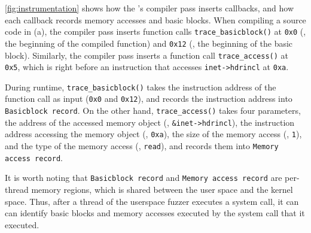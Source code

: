 \autoref{fig:instrumentation} shows how the \sys's compiler pass
inserts callbacks, and how each callback records memory accesses and
basic blocks.
%
When compiling a source code in (a), the compiler pass inserts
function calls \texttt{trace_basicblock()} at \texttt{0x0} (\ie, the
beginning of the compiled function) and \texttt{0x12} (\ie, the
beginning of the basic block).
%
Similarly, the compiler pass inserts a function call
\texttt{trace_access()} at \texttt{0x5}, which is right before an
instruction that accesses \texttt{inet->hdrincl} at \texttt{0xa}.


During runtime, \texttt{trace_basicblock()} takes the instruction
address of the function call as input (\ie \texttt{0x0} and
\texttt{0x12}), and records the instruction address into
\texttt{Basicblock record}.
%
On the other hand, \texttt{trace_access()} takes four parameters, the
address of the accessed memory object (\ie, \texttt{\&inet->hdrincl}),
the instruction address accessing the memory object (\ie,
\texttt{0xa}), the size of the memory access (\ie, \texttt{1}), and
the type of the memory access (\ie, \texttt{read}), and records them
into \texttt{Memory access record}.






It is worth noting that \texttt{Basicblock record} and \texttt{Memory
  access record} are per-thread memory regions, which is shared
between the user space and the kernel space. Thus, after a thread of
the userspace fuzzer executes a system call, it can can identify basic
blocks and memory accesses executed by the system call that it
executed.








